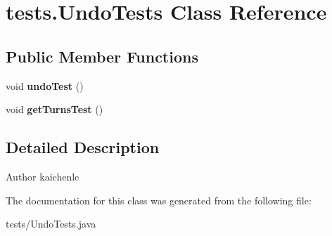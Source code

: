 \hypertarget{classtests_1_1_undo_tests}{}\section{tests.\+Undo\+Tests Class Reference}
\label{classtests_1_1_undo_tests}
\subsection*{Public Member Functions}
\begin{DoxyCompactItemize}
\item 
\mbox{\label{classtests_1_1_undo_tests_a63bfab73d9714ce1e1928cd2008fe9be}} 
void {\bfseries undo\+Test} ()
\item 
\mbox{\label{classtests_1_1_undo_tests_ae95dec01298d257be5ddd0f5e83b4d99}} 
void {\bfseries get\+Turns\+Test} ()
\end{DoxyCompactItemize}


\subsection{Detailed Description}
\begin{DoxyAuthor}{Author}
kaichenle 
\end{DoxyAuthor}


The documentation for this class was generated from the following file\+:\begin{DoxyCompactItemize}
\item 
tests/Undo\+Tests.\+java\end{DoxyCompactItemize}
